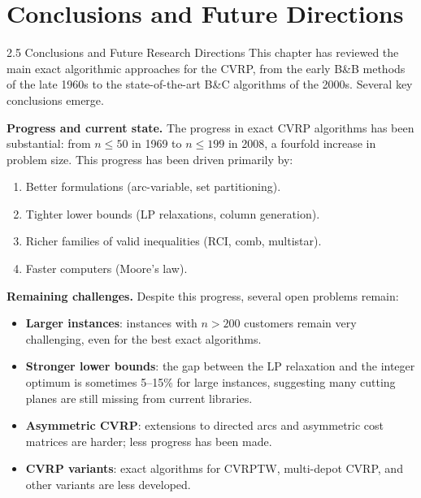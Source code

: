 \documentclass[aspectratio=169,10pt]{beamer}
\begin{document}
\section{Conclusions and Future Directions}

\begin{frame}[allowframebreaks]{2.5 Conclusions and Future Research Directions}
  This chapter has reviewed the main exact algorithmic approaches for the
  CVRP, from the early B\&B methods of the late 1960s to the state-of-the-art
  B\&C algorithms of the 2000s. Several key conclusions emerge.

  \bigskip
  \textbf{Progress and current state.} The progress in exact CVRP algorithms
  has been substantial: from $n \leq 50$ in 1969 to $n \leq 199$ in 2008,
  a fourfold increase in problem size. This progress has been driven primarily
  by:
  \begin{enumerate}
    \item Better formulations (arc-variable, set partitioning).
    \item Tighter lower bounds (LP relaxations, column generation).
    \item Richer families of valid inequalities (RCI, comb, multistar).
    \item Faster computers (Moore's law).
  \end{enumerate}

  \framebreak

  \textbf{Remaining challenges.} Despite this progress, several open problems
  remain:
  \begin{itemize}
    \item \textbf{Larger instances}: instances with $n > 200$ customers remain
          very challenging, even for the best exact algorithms.
    \item \textbf{Stronger lower bounds}: the gap between the LP relaxation
          and the integer optimum is sometimes 5--15\% for large instances,
          suggesting many cutting planes are still missing from current libraries.
    \item \textbf{Asymmetric CVRP}: extensions to directed arcs and
          asymmetric cost matrices are harder; less progress has been made.
    \item \textbf{CVRP variants}: exact algorithms for CVRPTW, multi-depot
          CVRP, and other variants are less developed.
  \end{itemize}


\end{frame}
\end{document}
